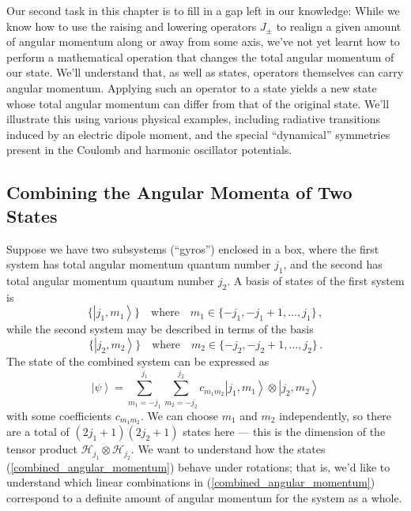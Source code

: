 \documentclass{article}
\theoremstyle{plain}\theoremheaderfont{\normalfont\itshape}\theorembodyfont{\rmfamily}\theoremseparator{.}\newtheorem*{rem}{Remark}\newtheorem*{ex}{Example}\newtheorem*{proof}{Proof}\newtheorem*{altp}{Alternative proof}
\theoremstyle{plain}\theoremheaderfont{\normalfont\bfseries}\theorembodyfont{\rmfamily}\theoremseparator{.}\newtheorem{thm}{Theorem}[section]\newtheorem{lem}[thm]{Lemma}\newtheorem{prop}[thm]{Proposition}\newtheorem*{cor}{Corollary}\newtheorem{defn}[thm]{Definition}\newtheorem{clm}[thm]{Claim}\newtheorem{clminproof}{Claim}
\theoremstyle{break}\theoremheaderfont{\normalfont\itshape}\theorembodyfont{\rmfamily}\theoremseparator{.\medskip}\newtheorem*{proofskip}{Proof}\newtheorem*{exs}{Examples}\newtheorem*{rems}{Remarks}
\theoremstyle{break}\theoremheaderfont{\normalfont\bfseries}\theorembodyfont{\rmfamily}\theoremseparator{.\medskip}\newtheorem{lemskip}[thm]{Lemma}\newtheorem{defnskip}[thm]{Definition}\newtheorem{propskip}[thm]{Proposition}\newtheorem{thmskip}[thm]{Theorem}
\numberwithin{equation}{section}
\newcommand{\ket}[1]{\left| #1 \right\rangle}
\newcommand{\hb}{\mathcal{H}}
\begin{document}
    Our second task in this chapter is to fill in a gap left in our knowledge: While we know how to use the raising and lowering operators \(J_\pm\) to realign a given amount of angular momentum along or away from some axis, we've not yet learnt how to perform a mathematical operation that changes the total angular momentum of our state. We'll understand that, as well as states, operators themselves can carry angular momentum. Applying such an operator to a state yields a new state whose total angular momentum can differ from that of the original state. We'll illustrate this using various physical examples, including radiative transitions induced by an electric dipole moment, and the special ``dynamical'' symmetries present in the Coulomb and harmonic oscillator potentials.

    \subsection{Combining the Angular Momenta of Two States}
    Suppose we have two subsystems (``gyros'') enclosed in a box, where the first system has total angular momentum quantum number \(j_1\), and the second has total angular momentum quantum number \(j_2\). A basis of states of the first system is
    \begin{equation}
        \{\ket{j_1,m_1}\}\quad\text{where}\quad m_1\in\{-j_1,-j_1+1,\dots,j_1\}\,,
    \end{equation}
    while the second system may be described in terms of the basis
    \begin{equation}
        \{\ket{j_2,m_2}\}\quad\text{where}\quad m_2\in\{-j_2,-j_2+1,\dots,j_2\}\,.
    \end{equation}
    The state of the combined system can be expressed as
    \begin{equation}\label{combined_angular_momentum}
        \ket{\psi}=\sum_{m_1=-j_1}^{j_1}\sum_{m_2=-j_2}^{j_2}c_{m_1m_2}\ket{j_1,m_1}\otimes\ket{j_2,m_2}
    \end{equation}
    with some coefficients \(c_{m_1m_2}\). We can choose \(m_1\) and \(m_2\) independently, so there are a total of \((2j_1+1)(2j_2+1)\) states here --- this is the dimension of the tensor product \(\hb_{j_1}\otimes\hb_{j_2}\). We want to understand how the states (\ref{combined_angular_momentum}) behave under rotations; that is, we'd like to understand which linear combinations in (\ref{combined_angular_momentum}) correspond to a definite amount of angular momentum for the system as a whole.
\end{document}
